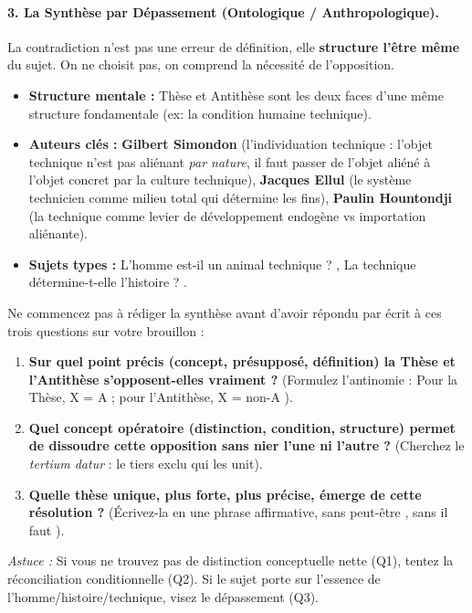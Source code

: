 \documentclass[11pt]{article}
\begin{document}
\paragraph{3. La Synthèse par Dépassement (Ontologique / Anthropologique).}
La contradiction n'est pas une erreur de définition, elle \textbf{structure l'être même} du sujet. On ne \og{} choisit \fg{} pas, on \og{} comprend \fg{} la nécessité de l'opposition.
\begin{itemize}
    \item \textbf{Structure mentale :} \og{} Thèse et Antithèse sont les deux faces d'une même structure fondamentale (ex: la condition humaine technique). \fg{}
    \item \textbf{Auteurs clés :} \textbf{Gilbert Simondon} (l'individuation technique : l'objet technique n'est pas aliénant \emph{par nature}, il faut passer de l'objet \og{} aliéné \fg{} à l'objet \og{} concret \fg{} par la culture technique), \textbf{Jacques Ellul} (le \og{} système technicien \fg{} comme milieu total qui détermine les fins), \textbf{Paulin Hountondji} (la technique comme levier de \og{} développement endogène \fg{} vs importation aliénante).
    \item \textbf{Sujets types :} \og{} L'homme est-il un animal technique ? \fg{}, \og{} La technique détermine-t-elle l'histoire ? \fg{}.
\end{itemize}

\begin{methode}
Ne commencez pas à rédiger la synthèse avant d'avoir répondu par écrit à ces trois questions sur votre brouillon :
\begin{enumerate}
    \item \textbf{Sur quel point précis (concept, présupposé, définition) la Thèse et l'Antithèse s'opposent-elles vraiment ?} (Formulez l'antinomie : \og{} Pour la Thèse, X = A ; pour l'Antithèse, X = non-A \fg{}).
    \item \textbf{Quel concept opératoire (distinction, condition, structure) permet de dissoudre cette opposition sans nier l'une ni l'autre ?} (Cherchez le \emph{tertium datur} : le tiers exclu qui les unit).
    \item \textbf{Quelle thèse unique, plus forte, plus précise, émerge de cette résolution ?} (Écrivez-la en une phrase affirmative, sans \og{} peut-être \fg{}, sans \og{} il faut \fg{}).
\end{enumerate}
\emph{Astuce :} Si vous ne trouvez pas de distinction conceptuelle nette (Q1), tentez la réconciliation conditionnelle (Q2). Si le sujet porte sur l'essence de l'homme/histoire/technique, visez le dépassement (Q3).
\end{methode}
\end{document}
